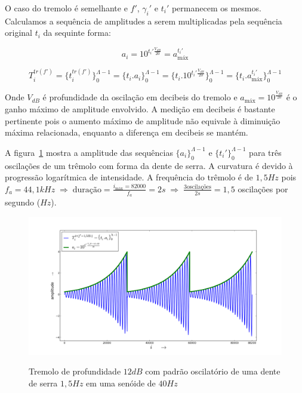 O caso do tremolo é semelhante e $f'$, $\gamma_i'$ e $t_i'$ permanecem os mesmos. Calculamos
a sequência de amplitudes a serem multiplicadas pela sequência original $t_i$ da
sequinte forma:

\begin{equation}\label{trA}
a_i=10^{t_i' \frac{V_{dB}}{20}} = a_{\text{máx}}^{t_i'}
\end{equation}

\begin{equation}\label{trT}
T_i^{tr(f')}=\{ t_i^{tr(f')} \}_0^{\Lambda-1}=\{ t_i . a_i \}_0^{\Lambda-1}=\{t_i .10^{t_i' \frac{V_{dB}}{20}}    \}_0^{\Lambda-1}=\{t_i . a_{\text{máx}}^{t_i'}\}_0^{\Lambda-1}
\end{equation}

Onde $V_{dB}$ é profundidade da oscilação em decibeis do tremolo e $a_{\text{máx}}=10^{\frac{V_{dB}}{20}}$
 é o ganho máximo de amplitude envolvido.
A medição em decibeis é bastante pertinente pois o aumento máximo de amplitude
não equivale à diminuição máxima relacionada, enquanto a diferença em decibeis se mantém.

A figura~\ref{fig:tremolo} mostra a amplitude das sequências $\{a_i\}_0^{\Lambda-1}$ e $\{t_i'\}_0^{\Lambda-1}$
para três oscilações de um trêmolo com forma da dente de serra. A curvatura é devido à progressão logarítmica de
intensidade. A frequência do trêmolo é de $1,5Hz$ pois $f_a=44,1kHz \; \Rightarrow \; \text{duração} = \frac{i_{\text{máx}}=82000}{f_a}= 2s \; \Rightarrow \; \frac{3\text{oscilações}}{2s}=1,5$ oscilações por segundo ($Hz$). 

\begin{figure}[h!]
    \centering
    \caption{Tremolo de profundidade $12dB$ com padrão oscilatório de uma dente de serra $1,5Hz$ em uma senóide de $40Hz$}
        \includegraphics[width=\textwidth]{figuras/tremolo}
        \label{fig:tremolo}
\end{figure}

